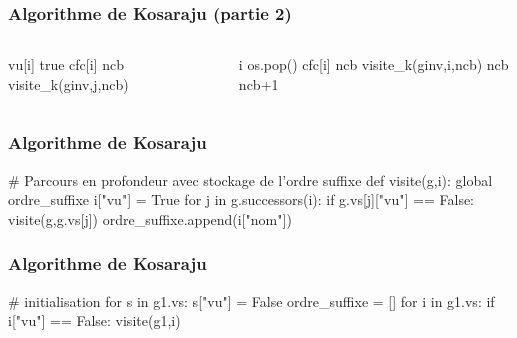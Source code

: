     \begin{frame}[fragile]
        \frametitle{Algorithme de Kosaraju (partie 2)}
            \begin{columns}
                \begin{column}{.5\textwidth}
                    \begin{algorithmic}[1]
                        \State vu[i] \gets true
                        \State cfc[i] \gets ncb
                                \State visite\_k(ginv,j,ncb)
                            \EndIf
                        \EndFor
                        \EndFunction
                    \end{algorithmic}
                \end{column}
                \begin{column}{.5\textwidth}
                    \begin{algorithmic}[1]
                        \State i \gets os.pop() 
                            \State cfc[i] \gets ncb
                            \State visite\_k(ginv,i,ncb)
                            \State ncb \gets ncb+1
                        \EndIf
                        \EndWhile
                        \end{algorithmic}            
                \end{column}
            \end{columns}    
        \end{frame}
    

\begin{frame}[fragile]
\frametitle{Algorithme de Kosaraju}
\begin{pythoncode}
# Parcours en profondeur avec stockage de l'ordre suffixe 
def visite(g,i):
    global ordre_suffixe
    i["vu"] = True
    for j in g.successors(i):
        if g.vs[j]["vu"] == False:
            visite(g,g.vs[j])
    ordre_suffixe.append(i["nom"])


\end{pythoncode}
\end{frame}


\begin{frame}[fragile]
\frametitle{Algorithme de Kosaraju}
\begin{pythoncode}    
# initialisation
for s in g1.vs:
    s["vu"] = False
ordre_suffixe = []
for i in g1.vs:
    if i["vu"] == False:
        visite(g1,i)

\end{pythoncode}
\end{frame}

